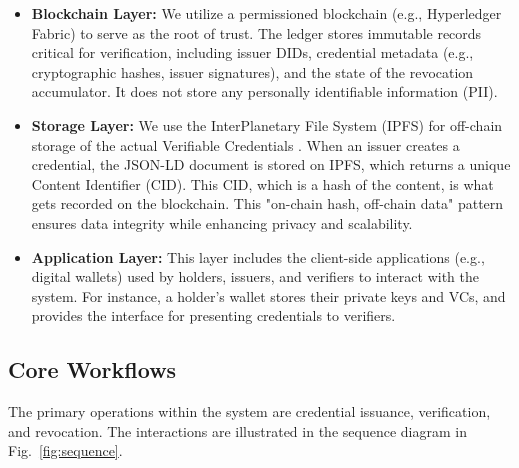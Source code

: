 \documentclass[lettersize,journal]{IEEEtran}
\begin{document}

\begin{itemize}
    \item \textbf{Blockchain Layer:} We utilize a permissioned blockchain (e.g., Hyperledger Fabric) to serve as the root of trust. The ledger stores immutable records critical for verification, including issuer DIDs, credential metadata (e.g., cryptographic hashes, issuer signatures), and the state of the revocation accumulator. It does not store any personally identifiable information (PII).
    \item \textbf{Storage Layer:} We use the InterPlanetary File System (IPFS) for off-chain storage of the actual Verifiable Credentials \cite{IPFS2023}. When an issuer creates a credential, the JSON-LD document is stored on IPFS, which returns a unique Content Identifier (CID). This CID, which is a hash of the content, is what gets recorded on the blockchain. This "on-chain hash, off-chain data" pattern ensures data integrity while enhancing privacy and scalability.
    \item \textbf{Application Layer:} This layer includes the client-side applications (e.g., digital wallets) used by holders, issuers, and verifiers to interact with the system. For instance, a holder's wallet stores their private keys and VCs, and provides the interface for presenting credentials to verifiers.
\end{itemize}

\subsection{Core Workflows}
The primary operations within the system are credential issuance, verification, and revocation. The interactions are illustrated in the sequence diagram in Fig.~\ref{fig:sequence}.

\end{document}
